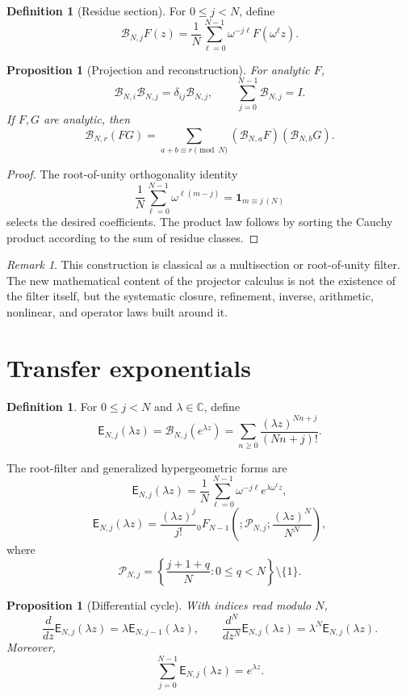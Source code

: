 \documentclass[11pt]{article}
\newtheorem{proposition}[theorem]{Proposition}
\theoremstyle{definition}
\newtheorem{definition}[theorem]{Definition}
\theoremstyle{remark}
\newtheorem{remark}[theorem]{Remark}
\newcommand{\BNj}{\mathcal B_{N,j}}
\newcommand{\EE}{\mathsf E}
\newcommand{\C}{\mathbb C}
\begin{document}
\begin{definition}[Residue section]
For $0\le j<N$, define
\[
\BNj F(z)=\frac1N\sum_{\ell=0}^{N-1}\omega^{-j\ell}F(\omega^\ell z).
\]
\end{definition}

\begin{proposition}[Projection and reconstruction]
For analytic $F$,
\[
\mathcal B_{N,i}\mathcal B_{N,j}=\delta_{ij}\mathcal B_{N,j},
\qquad
\sum_{j=0}^{N-1}\mathcal B_{N,j}=I.
\]
If $F,G$ are analytic, then
\[
\mathcal B_{N,r}(FG)
=\sum_{a+b\equiv r\pmod N}
(\mathcal B_{N,a}F)(\mathcal B_{N,b}G).
\]
\end{proposition}

\begin{proof}
The root-of-unity orthogonality identity
\[
\frac1N\sum_{\ell=0}^{N-1}\omega^{\ell(m-j)}
=\mathbf 1_{m\equiv j\, (N)}
\]
selects the desired coefficients.  The product law follows by sorting the Cauchy product according to the sum of residue classes.
\end{proof}

\begin{remark}
This construction is classical as a multisection or root-of-unity filter.  The new mathematical content of the projector calculus is not the existence of the filter itself, but the systematic closure, refinement, inverse, arithmetic, nonlinear, and operator laws built around it.
\end{remark}

\section{Transfer exponentials}

\begin{definition}
For $0\le j<N$ and $\lambda\in\C$, define
\[
\boxed{
\EE_{N,j}(\lambda z)
=\mathcal B_{N,j}(e^{\lambda z})
=\sum_{n\ge0}\frac{(\lambda z)^{Nn+j}}{(Nn+j)!}.
}
\]
\end{definition}

The root-filter and generalized hypergeometric forms are
\[
\EE_{N,j}(\lambda z)
=\frac1N\sum_{\ell=0}^{N-1}\omega^{-j\ell}e^{\lambda\omega^\ell z},
\]
\[
\EE_{N,j}(\lambda z)
=\frac{(\lambda z)^j}{j!}
{}_0F_{N-1}\!\left(;
\mathcal P_{N,j};\frac{(\lambda z)^N}{N^N}\right),
\]
where
\[
\mathcal P_{N,j}
=\left\{\frac{j+1+q}{N}:0\le q<N\right\}\setminus\{1\}.
\]

\begin{proposition}[Differential cycle]
With indices read modulo $N$,
\[
\frac{d}{dz}\EE_{N,j}(\lambda z)
=\lambda\EE_{N,j-1}(\lambda z),
\qquad
\frac{d^N}{dz^N}\EE_{N,j}(\lambda z)
=\lambda^N\EE_{N,j}(\lambda z).
\]
Moreover,
\[
\sum_{j=0}^{N-1}\EE_{N,j}(\lambda z)=e^{\lambda z}.
\]
\end{proposition}
\end{document}
